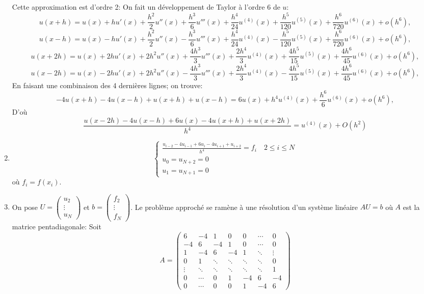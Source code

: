 \documentclass[a4paper,11pt]{article}
\begin{document}
\begin{enumerate}
Cette approximation est  d'ordre 2: On fait un développement de Taylor à l'ordre 6 de $u$:
\[u(x+h)=u(x)+h u'(x)+\frac{h^2}2 u''(x)+\frac{h^3}6 u'''(x)+\frac{h^4}{24} u^{(4)}(x) +\frac{h^5}{120} u^{(5)}(x) +\frac{h^6}{720} u^{(6)}(x)+o(h^6)  ,\]
\[u(x-h)=u(x)-h u'(x)+\frac{h^2}2 u''(x)-\frac{h^3}6 u'''(x)+\frac{h^4}{24} u^{(4)}(x) -\frac{h^5}{120} u^{(5)}(x) +\frac{h^6}{720} u^{(6)}(x) +o(h^6) ,\]
\[u(x+2h)=u(x)+2h u'(x)+2h^2 u''(x)+\frac{4h^3}3 u'''(x)+\frac{2h^4}{3} u^{(4)}(x) +\frac{4h^5}{15} u^{(5)}(x) +\frac{4h^6}{45} u^{(6)}(x) +o(h^6) ,\]
\[u(x-2h)=u(x)-2h u'(x)+2h^2 u''(x)-\frac{4h^3}3 u'''(x)+\frac{2h^4}{3} u^{(4)}(x) -\frac{4h^5}{15} u^{(5)}(x) +\frac{4h^6}{45} u^{(6)}(x) +o(h^6) ,\]
En faisant une combinaison des 4 dernières lignes; on trouve:
\[-4u(x+h)-4u(x-h)+u(x+h)+u(x-h)=6u(x)+h^4 u^{(4)}(x)+\frac{h^6}{6} u^{(6)}(x) +o(h^6) ,\]
D'où
\[ \frac{u(x-2h)-4u(x-h)+6u(x)-4u(x+h)+u(x+2h)}{h^4}= u^{(4)}(x) +O(h^2)\]
\item 
\[\left\{\begin{array}{l}
\displaystyle \frac{u_{i-2}-4u_{i-1}+6u_i-4u_{i+1}+u_{i+2}}{h^4}=f_i \quad 2\leq i\leq N\\
u_0=u_{N+2}=0\\
u_1=u_{N+1}=0
\end{array}\right.
\]
où  $f_i=f(x_i)$.
\item On pose $U=\left(\begin{array}{c}  u_2 \\ \vdots \\ u_N \end{array}\right)$ et $b=\left(\begin{array}{c} f_2 \\ \vdots \\ f_N \end{array}\right)$. Le problème approché se ramène à une résolution d'un système linéaire $A U = b$ où $A$ est la matrice pentadiagonale:
Soit \[A=
\left(\begin{array}{ccccccc}
6&-4&1&0&0&\cdots&0\\
-4&6&-4&1&0&\cdots&0\\
1&-4&6&-4&1& \ddots  &\vdots\\
0& 1 &\ddots &\ddots &\ddots&\ddots&0 \\
\vdots &  \ddots &\ddots &\ddots &\ddots&\ddots&1\\
0 &\cdots &0&1 &-4&6&-4\\
   0&\cdots&0  &0&1&-4  &6
\end{array}\right)
\] 
\end{enumerate}
\end{document}
